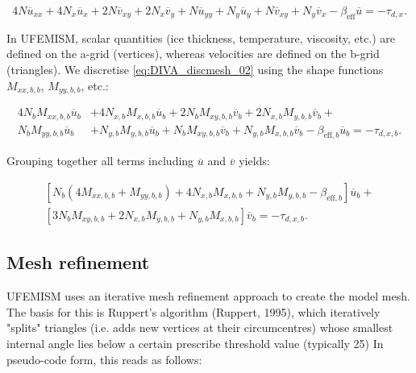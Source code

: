 \documentclass{article}
\begin{document}
\begin{equation} \label{eq:DIVA_discmesh_02}
4 N \overline{u}_{xx} + 4 N_x \overline{u}_x + 2 N \overline{v}_{xy} + 2 N_x \overline{v}_y +
N \overline{u}_{yy} + N_y \overline{u}_y + N \overline{v}_{xy} + N_y \overline{v}_x
- \beta_{\textrm{eff}} \overline{u} = -\tau_{d,x}.
\end{equation}

In UFEMISM, scalar quantities (ice thickness, temperature, viscosity, etc.) are defined on the a-grid (vertices), whereas velocities are defined on the b-grid (triangles). We discretise \eqref{eq:DIVA_discmesh_02} using the shape functions $M_{xx,b,b}$, $M_{yy,b,b}$, etc.:

\begin{equation} \label{eq:DIVA_discmesh_03}
\begin{split}
4 N_b M_{xx,b,b} \overline{u}_b &+ 4 N_{x,b} M_{x,b,b} \overline{u}_b +
2 N_b M_{xy,b,b} \overline{v}_b + 2 N_{x,b} M_{y,b,b} \overline{v}_b + \\
N_b M_{yy,b,b} \overline{u}_b &+ N_{y,b} M_{y,b,b} \overline{u}_b +
N_b M_{xy,b,b} \overline{v}_b + N_{y,b} M_{x,b,b} \overline{v}_b
- \beta_{\textrm{eff},b} \overline{u}_b = -\tau_{d,x,b}.
\end{split}
\end{equation}

Grouping together all terms including $\overline{u}$ and $\overline{v}$ yields:

\begin{equation} \label{eq:DIVA_discmesh_04}
\begin{split}
\left[ N_b \left( 4 M_{xx,b,b} + M_{yy,b,b} \right)
+ 4 N_{x,b} M_{x,b,b} + N_{y,b} M_{y,b,b} - \beta_{\textrm{eff},b} \right] \overline{u}_b + \\
\left[ 3 N_b M_{xy,b,b} + 2 N_{x,b} M_{y,b,b} + N_{y,b} M_{x,b,b} \right] \overline{v}_b = -\tau_{d,x,b}.
\end{split}
\end{equation}

\newpage
\subsection{Mesh refinement}

UFEMISM uses an iterative mesh refinement approach to create the model mesh. The basis for this is Ruppert's algorithm (Ruppert, 1995), which iteratively "splits" triangles (i.e. adds new vertices at their circumcentres) whose smallest internal angle lies below a certain prescribe threshold value (typically 25\degree) In pseudo-code form, this reads as follows:
\end{document}
